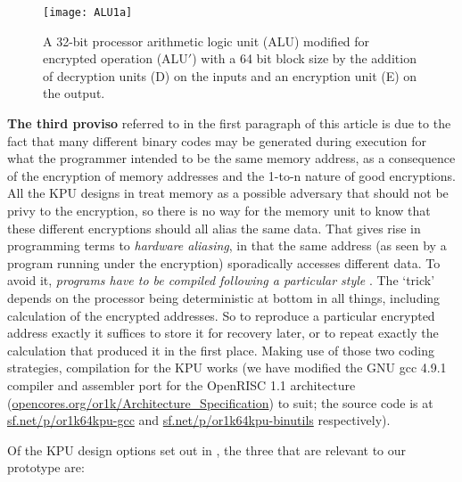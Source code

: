\documentclass[conference]{IEEEtran}
\def\para#1{{\bf{#1}}}
\begin{document}
\begin{figure}[!t]
\centering
\texttt{[image: ALU1a]}
\caption{A 32-bit processor arithmetic logic unit (ALU) modified for
encrypted operation (ALU$'$) with a 64 bit block size by the addition of
decryption units (D) on the inputs and an encryption unit (E) on the
output.}
\label{f:1}
\end{figure}


\para{The third proviso} referred to in the first paragraph of this
article is due to the fact that many different binary codes may be
generated during execution for what the programmer intended to be
the same memory address, as a consequence of the encryption of memory
addresses and the 1-to-n nature of good encryptions.  All the KPU
designs in \cite{BB14b} treat memory as a possible adversary that should
not be privy to the encryption, so there is no way for the memory unit
to know that these different encryptions should all alias the same data.
That gives rise in programming terms to 
{\em hardware aliasing}, in that the same address (as seen by a
program running under the encryption) sporadically accesses
different data.  To avoid it, {\em programs have to be compiled
following a particular style} \cite{BB14a,BB14c,BBP15}.  The `trick'
depends on the processor being deterministic at bottom
in all things, including calculation of the encrypted
addresses.  So to reproduce a particular encrypted address exactly it
suffices to store it for recovery later, or to repeat exactly the
calculation that produced it in the first place.  Making use of those
two coding strategies, compilation for the KPU works (we have modified
the GNU gcc 4.9.1 compiler and assembler port for the OpenRISC 1.1
architecture
(\url{opencores.org/or1k/Architecture_Specification})
to suit; the source code is at
\url{sf.net/p/or1k64kpu-gcc} and \url{sf.net/p/or1k64kpu-binutils}
respectively).


Of the KPU design options set out in \cite{BB14b}, the three that are
relevant to our prototype are:
\end{document}
